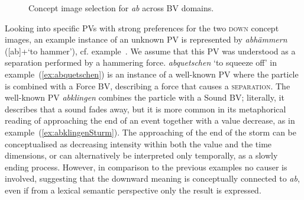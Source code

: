 \documentclass[output=paper]{langsci/langscibook}
\begin{document}
\begin{figure}
  \caption{Concept image selection for \textit{ab} across BV domains.}
  \label{fig:particle-prop-domain-ab}
\end{figure}

Looking into specific PVs with strong preferences for the two
\textsc{down} concept images, an example instance of an unknown PV is represented
by \textit{abhämmern} ([ab]+`to hammer'),
cf. example~. We assume that this PV was understood
as a separation performed by a hammering force. \textit{abquetschen}
`to squeeze off' in example~(\ref{ex:abquetschen}) is an instance of
a well-known PV where the particle is combined with a Force
BV, describing a force that causes a \textsc{separation}. The
well-known PV \textit{abklingen} combines the particle with a
Sound BV; literally, it describes that a sound fades away,
but it is more common in its metaphorical reading of approaching the
end of an event together with a value decrease, as in
example~(\ref{ex:abklingenSturm}). The approaching of the end of the
storm can be conceptualised as decreasing intensity within both the
value and the time dimensions, or can alternatively be interpreted
only temporally, as a slowly ending process. However, in comparison to
the previous examples no causer is involved, suggesting that the
downward meaning is conceptually connected to \textit{ab}, even if
from a lexical semantic perspective only the result is expressed.
\end{document}
